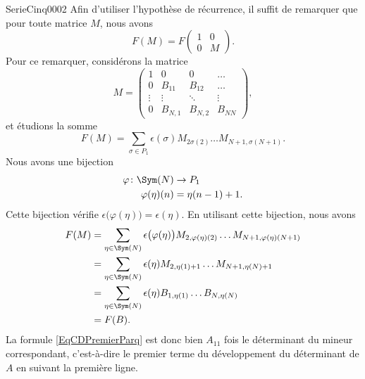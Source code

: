\begin{corrige}{SerieCinq0002}
Afin d'utiliser l'hypothèse de récurrence, il suffit de remarquer que pour toute matrice $M$, nous avons
\begin{equation}
	F(M)=F\begin{pmatrix}
		1	&	0	\\ 
		0	&	M	
	\end{pmatrix}.
\end{equation}
Pour ce remarquer, considérons la matrice
\begin{equation}
	M=\begin{pmatrix}
		 1	&	0	&	0	&	\ldots	\\
		 0	&	B_{11}	&	B_{12}	&	\ldots	\\
		 \vdots	&	\vdots	&	\ddots	&	\vdots	\\ 
		 0	&	B_{N,1}	&	B_{N,2}	&	B_{NN}	 
	 \end{pmatrix},
\end{equation}
et étudions la somme
\begin{equation}
	F(M)=\sum_{\sigma\in P_1}\epsilon(\sigma)M_{2\sigma(2)}\ldots M_{N+1,\sigma(N+1)}.
\end{equation}
Nous avons une bijection
\begin{equation}
	\begin{aligned}
		\varphi\colon \Sym(N)&\to P_1 \\
		\varphi(\eta)(n)&=\eta(n-1)+1.
	\end{aligned}
\end{equation}
Cette bijection vérifie $\epsilon\big( \varphi(\eta) \big)=\epsilon(\eta)$. En utilisant cette bijection, nous avons
\begin{equation}
	\begin{aligned}[]
		F(M)&=\sum_{\eta\in\Sym(N)}\epsilon\big( \varphi(\eta) \big)M_{2,\varphi(\eta)(2)}\ldots M_{N+1,\varphi(\eta)(N+1)}\\
			&=\sum_{\eta\in\Sym(N)}\epsilon(\eta)M_{2,\eta(1)+1}\ldots M_{N+1,\eta(N)+1}\\
			&=\sum_{\eta\in\Sym(N)}\epsilon(\eta)B_{1,\eta(1)}\ldots B_{N,\eta(N)}\\
			&=F(B).
	\end{aligned}
\end{equation}
La formule \eqref{EqCDPremierParq} est donc bien $A_{11}$ fois le déterminant du mineur correspondant, c'est-à-dire le premier terme du développement du déterminant de $A$ en suivant la première ligne.


\end{corrige}
